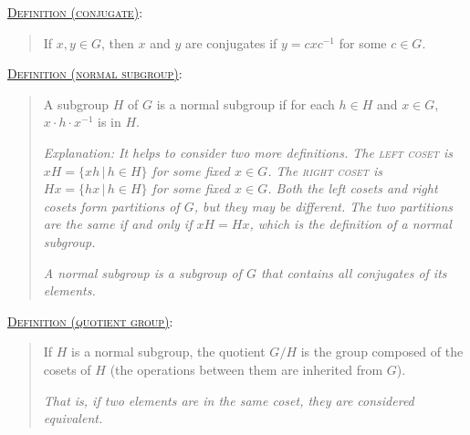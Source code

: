 \documentclass[letterpaper, 12pt]{book}
\newcommand{\defn}[2]{\textsc{\underline{Definition (#1)}:}\begin{quote} #2\end{quote}}
\begin{document}
\begin{enumerate}[resume]
        \defn{conjugate}{If $x,y\in G$, then $x$ and $y$ are conjugates if $y=cxc^{-1}$ for some $c\in G$.}

        \defn{normal subgroup}{A subgroup $H$ of $G$ is a normal subgroup if for each $h\in H$ and $x\in G$, $x\cdot h\cdot x^{-1}$ is in $H$.

        \textit{Explanation: It helps to consider two more definitions. The \textsc{left coset} is $xH = \{xh\,|\,h\in H\}$ for some fixed $x\in G$. The \textsc{right coset} is $Hx = \{hx\,|\,h\in H\}$ for some fixed $x\in G$. Both the left cosets and right cosets form partitions of $G$, but they may be different. The two partitions are the same if and only if $xH = Hx$, which is the definition of a normal subgroup.}

        \textit{A normal subgroup is a subgroup of $G$ that contains all conjugates of its elements.}}

        \defn{quotient group}{If $H$ is a normal subgroup, the quotient $G/H$ is the group composed of the cosets of $H$ (the operations between them are inherited from $G$).

        \textit{That is, if two elements are in the same coset, they are considered equivalent.}}
    \end{enumerate}
\end{document}
